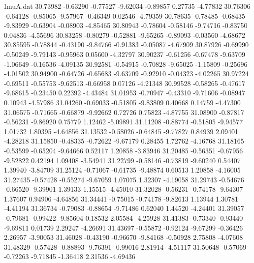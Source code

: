 \begin{filecontents}{ImuA.dat}
  30.73982   -0.63290   -0.77527   -9.62034   -0.89857    0.27735   -4.77832
  30.76306   -0.64128   -0.85065   -9.57967   -0.46349    0.02546   -4.79359
  30.78635   -0.78485   -0.68435   -9.83929   -0.63904   -0.08903   -4.85465
  30.80943   -0.78604   -0.58146   -9.74716   -0.83750    0.04836   -4.55696
  30.83258   -0.80279   -0.52881   -9.65265   -0.89093   -0.03560   -4.68672
  30.85595   -0.78844   -0.43190   -9.84766   -0.91383   -0.05087   -4.67909
  30.87926   -0.69990   -0.50249   -9.79143   -0.95963    0.05600   -4.32797
  30.90237   -0.61256   -0.67478   -9.63709   -1.06649   -0.16536   -4.09135
  30.92581   -0.54915   -0.70828   -9.65025   -1.15809   -0.25696   -4.01502
  30.94900   -0.64726   -0.65683   -9.63709   -0.92910   -0.04323   -4.02265
  30.97224   -0.69511   -0.55753   -9.62513   -0.66958    0.07126   -4.21348
  30.99528   -0.58265   -0.47617   -9.68615   -0.23450    0.22392   -4.43484
  31.01953   -0.70947   -0.43310   -9.71606   -0.08947    0.10943   -4.57986
  31.04260   -0.69033   -0.51805   -9.83809    0.40668    0.14759   -4.47300
  31.06575   -0.71665   -0.66879   -9.92662    0.72726    0.75823   -4.87755
  31.08900   -0.87817   -0.56231   -9.86920    0.75779    1.12462   -5.09891
  31.11208   -0.88774   -0.51805   -9.94577    1.01732    1.80395   -4.64856
  31.13532   -0.58026   -0.64845   -9.77827    0.84939    2.09401   -4.28218
  31.15850   -0.48335   -0.72622   -9.67179    0.28455    1.72762   -4.16768
  31.18165   -0.53599   -0.65204   -9.64666    0.52117    1.20858   -3.83946
  31.20485   -0.56351   -0.67956   -9.52822    0.42194    1.09408   -3.54941
  31.22799   -0.58146   -0.73819   -9.60240    0.54407    1.39940   -3.84709
  31.25124   -0.71067   -0.61735   -9.48874    0.60513    1.20858   -4.16005
  31.27435   -0.57428   -0.55274   -9.67059    1.07075    1.32307   -4.19058
  31.29743   -0.54676   -0.66520   -9.39901    1.39133    1.15515   -4.45010
  31.32028   -0.56231   -0.74178   -9.64307    1.37607    0.94906   -4.64856
  31.34441   -0.75015   -0.74178   -9.82613    1.13944    1.30781   -4.41194
  31.36734   -0.79083   -0.88654   -9.71486    0.62040    1.44520   -4.24401
  31.39057   -0.79681   -0.99422   -9.85604    0.18532    2.05584   -4.25928
  31.41383   -0.73340   -0.93440   -9.69811    0.01739    2.29247   -4.26691
  31.43697   -0.55872   -0.92124   -9.67299   -0.36426    2.26957   -3.90053
  31.46028   -0.43190   -0.96670   -9.84168   -0.50928    2.75808   -4.07608
  31.48329   -0.57428   -0.88893   -9.76391   -0.99016    2.81914   -4.51117
  31.50648   -0.57069   -0.72263   -9.71845   -1.36418    2.31536   -4.69436

\end{filecontents}
